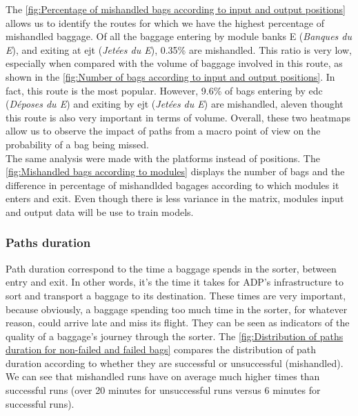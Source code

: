 \documentclass[12pt]{article}
\begin{document}
\indent The \autoref{fig:Percentage of mishandled bags according to input and output positions} allows us to identify the routes for which we have the highest percentage of mishandled baggage. 
Of all the baggage entering by module banks E (\textit{Banques du E}), and exiting at \acrshort{ejt} (\textit{Jetées du E}), 0.35\% are mishandled. This ratio is very low, especially when compared with the volume of baggage involved in this route, as shown in the \autoref{fig:Number of bags according to input and output positions}. In fact, this route is the most popular. 
However, 9.6\% of bags entering by \acrshort{edc} (\textit{Déposes du E}) and exiting by \acrshort{ejt} (\textit{Jetées du E}) are mishandled, aleven thought this route is also very important in terms of volume. Overall, these two heatmaps allow us to observe the impact of paths from a macro point of view on the probability of a bag being missed.\\
\indent The same analysis were made with the platforms instead of positions. The \autoref{fig:Mishandled bags according to modules} displays the number of bags and the difference in percentage of mishandlded bagages according to which modules it enters and exit. Even though there is less variance in the matrix, modules input and output data will be use to train models.


\subsubsection{Paths duration}\label{subsubsec:Paths duration}

Path duration correspond to the time a baggage spends in the sorter, between entry and exit. In other words, it's the time it takes for ADP's infrastructure to sort and transport a baggage to its destination. These times are very important, because obviously, a baggage spending too much time in the sorter, for whatever reason, could arrive late and miss its flight. They can be seen as indicators of the quality of a baggage's journey through the sorter. 
The \autoref{fig:Distribution of paths duration for non-failed and failed bags} compares the distribution of path duration according to whether they are successful or unsuccessful (mishandled). We can see that mishandled runs have on average much higher times than successful runs (over 20 minutes for unsuccessful runs versus 6 minutes for successful runs).
\end{document}
